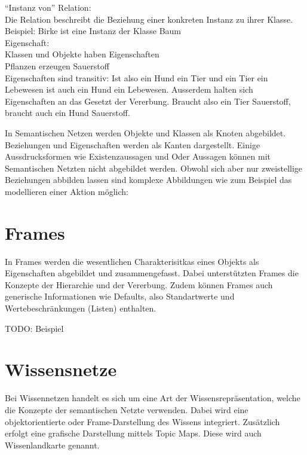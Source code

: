 "`Instanz von"' Relation:\\
\noindent\hspace*{15mm} Die Relation beschreibt die Beziehung einer konkreten Instanz zu ihrer Klasse.\\
\noindent\hspace*{15mm} Beispiel: Birke ist eine Instanz der Klasse Baum\\

Eigenschaft:\\
\noindent\hspace*{15mm} Klassen und Objekte haben Eigenschaften\\
\noindent\hspace*{15mm} Pflanzen erzeugen Sauerstoff\\
Eigenschaften sind transitiv: Ist also ein Hund ein Tier und ein Tier ein Lebewesen ist auch ein Hund ein Lebewesen. Ausserdem halten sich Eigenschaften an das Gesetzt der Vererbung. Braucht also ein Tier Sauerstoff, braucht auch ein Hund Sauerstoff.

In Semantischen Netzen werden Objekte und Klassen als Knoten abgebildet. Beziehungen und Eigenschaften werden als Kanten dargestellt.
Einige Aussdrucksformen wie Existenzaussagen und Oder Aussagen können mit Semantischen Netzten nicht abgebildet werden. Obwohl sich aber nur zweistellige Beziehungen abbilden lassen sind komplexe Abbildungen wie zum Beispiel das modellieren einer Aktion möglich:

\section{Frames}
\label{sec:wissensrepFormen_frames}

In Frames werden die wesentlichen Charakterisitkas eines Objekts als Eigenschaften abgebildet und zusammengefasst. Dabei unterstützten Frames die Konzepte der Hierarchie und der Vererbung. Zudem können Frames auch generische Informationen wie Defaults, also Standartwerte und Wertebeschränkungen (Listen) enthalten.

TODO: Beispiel

\section{Wissensnetze}
\label{sec:wissensrepFormen_Wissensnetze}
Bei Wissennetzen handelt es sich um eine Art der Wissensrepräsentation, welche die Konzepte der semantischen Netzte verwenden. Dabei wird eine objektorientierte oder Frame-Darstellung des Wissens integriert. Zusätzlich erfolgt eine grafische Darstellung mittels Topic Maps. Diese wird auch Wissenlandkarte genannt. 

